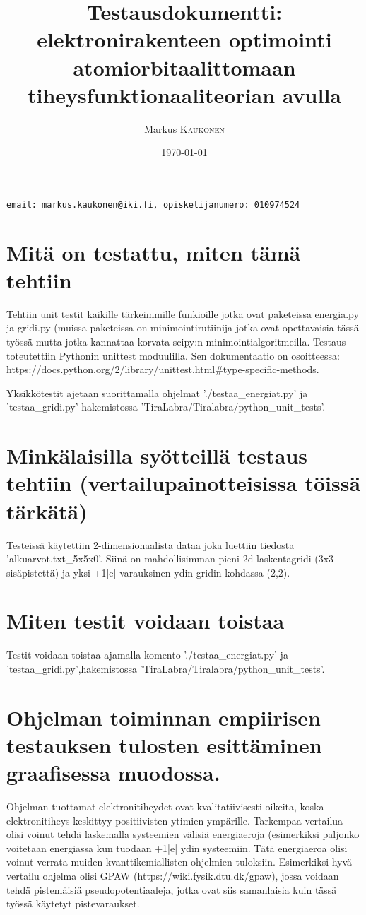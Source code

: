 \documentclass{article}
\title{Testausdokumentti: elektronirakenteen optimointi atomiorbitaalittomaan tiheysfunktionaaliteorian avulla} %
\author{Markus \textsc{Kaukonen} %
}
\date{\today} %
\begin{document}
\maketitle %
\hspace{1cm} \texttt{email: markus.kaukonen@iki.fi, opiskelijanumero: 010974524}

\newpage



\section{Mitä on testattu, miten tämä tehtiin}
Tehtiin unit testit kaikille tärkeimmille funkioille jotka ovat
paketeissa energia.py ja gridi.py (muissa paketeissa on
minimointirutiinija jotka ovat opettavaisia tässä työssä mutta jotka
kannattaa korvata scipy:n minimointialgoritmeilla.  Testaus
toteutettiin Pythonin unittest moduulilla. Sen dokumentaatio on
osoitteessa:
https://docs.python.org/2/library/unittest.html\#type-specific-methods.

Yksikkötestit ajetaan suorittamalla ohjelmat './testaa\_energiat.py' ja
'testaa\_gridi.py'
hakemistossa 'TiraLabra/Tiralabra/python\_unit\_tests'.


\section{Minkälaisilla syötteillä testaus tehtiin (vertailupainotteisissa töissä tärkätä)}
Testeissä käytettiin 2-dimensionaalista dataa joka luettiin tiedosta
'alkuarvot.txt\_5x5x0'. Siinä on mahdollisimman pieni 2d-laskentagridi
(3x3 sisäpistettä) ja yksi +1|e| varauksinen ydin gridin kohdassa (2,2).

\section{Miten testit voidaan toistaa}
Testit voidaan toistaa ajamalla komento './testaa\_energiat.py'
ja 'testaa\_gridi.py',hakemistossa 'TiraLabra/Tiralabra/python\_unit\_tests'.

\section{Ohjelman toiminnan empiirisen testauksen tulosten esittäminen graafisessa muodossa.}
Ohjelman tuottamat elektronitiheydet ovat kvalitatiivisesti oikeita,
koska elektronitiheys keskittyy positiivisten ytimien
ympärille. Tarkempaa vertailua olisi voinut tehdä laskemalla
systeemien välisiä energiaeroja (esimerkiksi paljonko voitetaan
energiassa kun tuodaan +1|e| ydin systeemiin. Tätä energiaeroa olisi
voinut verrata muiden kvanttikemiallisten ohjelmien
tuloksiin. Esimerkiksi hyvä vertailu ohjelma olisi GPAW
(https://wiki.fysik.dtu.dk/gpaw), jossa voidaan tehdä pistemäisiä
pseudopotentiaaleja, jotka ovat siis samanlaisia kuin tässä työssä
käytetyt pistevaraukset.
\end{document}
